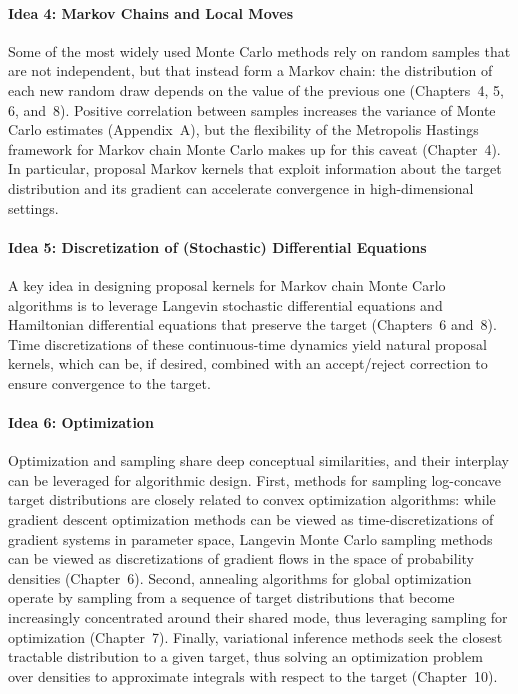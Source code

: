 \paragraph{Idea 4: Markov Chains and Local Moves}
Some of the most widely used Monte Carlo methods rely on random samples that are not independent,
but that instead form a Markov chain: the distribution of each new random draw depends on the value
of the previous one (Chapters~4, 5, 6, and~8). Positive correlation between samples increases the
variance of Monte Carlo estimates (Appendix~A), but the flexibility of the Metropolis Hastings
framework for Markov chain Monte Carlo makes up for this caveat (Chapter~4). In particular, proposal
Markov kernels that exploit information about the target distribution and its gradient can accelerate
convergence in high-dimensional settings.

\paragraph{Idea 5: Discretization of (Stochastic) Differential Equations}
A key idea in designing proposal kernels for Markov chain Monte Carlo algorithms is to leverage
Langevin stochastic differential equations and Hamiltonian differential equations that preserve the
target (Chapters~6 and~8). Time discretizations of these continuous-time dynamics yield natural
proposal kernels, which can be, if desired, combined with an accept/reject correction to ensure
convergence to the target.

\paragraph{Idea 6: Optimization}
Optimization and sampling share deep conceptual similarities, and their interplay can be leveraged
for algorithmic design. First, methods for sampling log-concave target distributions are closely
related to convex optimization algorithms: while gradient descent optimization methods can be viewed
as time-discretizations of gradient systems in parameter space, Langevin Monte Carlo sampling
methods can be viewed as discretizations of gradient flows in the space of probability densities
(Chapter~6). Second, annealing algorithms for global optimization operate by sampling from a
sequence of target distributions that become increasingly concentrated around their shared mode,
thus leveraging sampling for optimization (Chapter~7). Finally, variational inference methods seek
the closest tractable distribution to a given target, thus solving an optimization problem over
densities to approximate integrals with respect to the target (Chapter~10).

